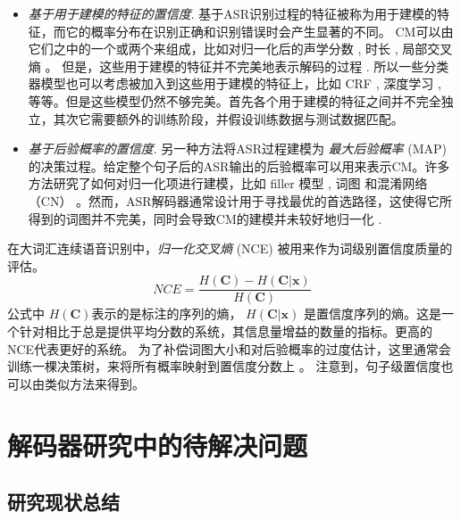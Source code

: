 \begin{itemize}
    \item {\em 基于用于建模的特征的置信度}.
    基于ASR识别过程的特征被称为用于建模的特征，而它的概率分布在识别正确和识别错误时会产生显著的不同。
    CM可以由它们之中的一个或两个来组成，比如对归一化后的声学分数 \cite{hu2013new}, 时长 \cite{ma2011fusing}, 局部交叉熵 \cite{falavigna2002acoustic}。
    但是，这些用于建模的特征并不完美地表示解码的过程 \cite{jiang2005confidence}. 所以一些分类器模型也可以考虑被加入到这些用于建模的特征上，比如 CRF \cite{seigel2013confidence}, 深度学习 \cite{yu2011calibration}, 等等。但是这些模型仍然不够完美。首先各个用于建模的特征之间并不完全独立，其次它需要额外的训练阶段，并假设训练数据与测试数据匹配。

    \item {\em 基于后验概率的置信度}.
    另一种方法将ASR过程建模为 {\em 最大后验概率} (MAP) 的决策过程。给定整个句子后的ASR输出的后验概率可以用来表示CM。许多方法研究了如何对归一化项进行建模，比如 filler 模型 \cite{young1994detecting}, 词图\cite{wessel2001confidence} 和混淆网络（CN） \cite{evermann2000large}。然而，ASR解码器通常设计用于寻找最优的首选路径，这使得它所得到的词图并不完美，同时会导致CM的建模并未较好地归一化 \cite{yu2006maximum}.

\end{itemize}

在大词汇连续语音识别中，{\em 归一化交叉熵 } (NCE) \cite{zhc00-chen-icassp2017} 被用来作为词级别置信度质量的评估。
     \begin{equation}\label{eq:nce}
    NCE=\frac{H(\mathbf{C})-H(\mathbf{C}|\mathbf{x})}{H(\mathbf{C})}
     \end{equation}
公式中 $H(\mathbf{C})$表示的是标注的序列的熵， $H(\mathbf{C}|\mathbf{x})$ 是置信度序列的熵。这是一个针对相比于总是提供平均分数的系统，其信息量增益的数量的指标。更高的NCE代表更好的系统。
% 
为了补偿词图大小和对后验概率的过度估计，这里通常会训练一棵决策树，来将所有概率映射到置信度分数上 \cite{evermann2000large}。 注意到，句子级置信度也可以由类似方法来得到。

\section{解码器研究中的待解决问题}
\label{chap:intro2-dec-future}
\subsection{研究现状总结}
\label{chap:intro2-dec-sumcur}

